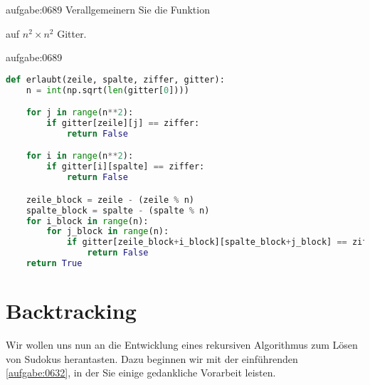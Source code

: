 \begin{aufgabe}{aufgabe:0689}
Verallgemeinern Sie die Funktion
\begin{center}
\end{center}
auf $n^2\times n^2$ Gitter.
  \end{aufgabe}
  \lstset{basicstyle=\ttfamily\footnotesize}
\begin{antwort}{aufgabe:0689}
\begin{lstlisting}[language=Python,caption=Funktion \pythoninline{erlaubt} für allgemeine Sudokus]
def erlaubt(zeile, spalte, ziffer, gitter):
	n = int(np.sqrt(len(gitter[0])))

	for j in range(n**2):
		if gitter[zeile][j] == ziffer:
			return False

	for i in range(n**2):
		if gitter[i][spalte] == ziffer:
			return False

	zeile_block = zeile - (zeile % n)
	spalte_block = spalte - (spalte % n)
	for i_block in range(n):
		for j_block in range(n):
			if gitter[zeile_block+i_block][spalte_block+j_block] == ziffer:
				return False
	return True
\end{lstlisting}  
\end{antwort}
\lstset{style=mystyle}

\clearpage
\section{Backtracking}
Wir wollen uns nun an die Entwicklung eines rekursiven Algorithmus zum Lösen von
Sudokus herantasten. Dazu beginnen wir mit der einführenden \cref{aufgabe:0632}, in der Sie einige gedankliche Vorarbeit leisten.

